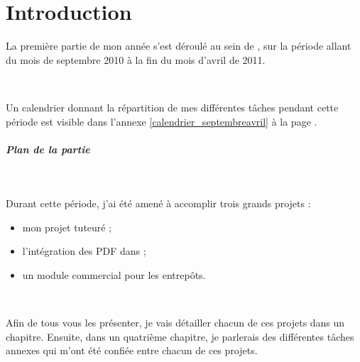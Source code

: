 \chapter{Introduction}
La première partie de mon année s'est déroulé au sein de \solulog, sur la période allant du mois de septembre 2010 à la fin du mois d'avril de 2011.

~

Un calendrier donnant la répartition de mes différentes tâches pendant cette période est visible dans l'annexe \ref{calendrier_septembreavril} à la page \pageref{calendrier_septembreavril}.

\paragraph{Plan de la partie}
~

Durant cette période, j'ai été amené à accomplir trois grands projets :
\begin{itemize}
	\item mon projet tuteuré ;
	\item l'intégration des PDF dans \integrale ;
	\item un module commercial pour les entrepôts.
\end{itemize}

~

Afin de tous vous les présenter, je vais détailler chacun de ces projets dans un chapitre. Ensuite, dans un quatrième chapitre, je parlerais des différentes tâches annexes qui m'ont été confiée entre chacun de ces projets.
